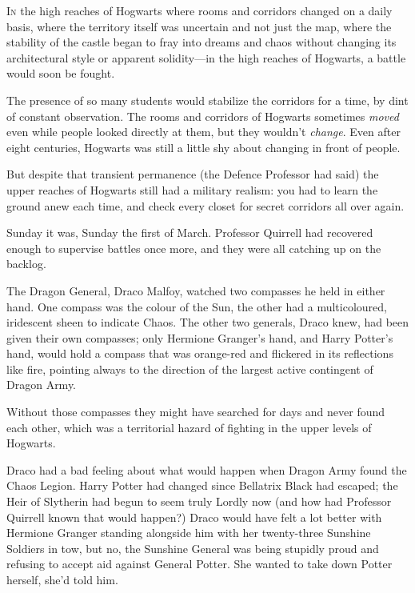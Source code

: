 
\lettrine{I}{n} the high
reaches of Hogwarts where rooms and corridors changed on a daily basis, where
the territory itself was uncertain and not just the map, where the stability of
the castle began to fray into dreams and chaos without changing its
architectural style or apparent solidity—in the high reaches of Hogwarts, a
battle would soon be fought.

The presence of so many students would stabilize the corridors for a time, by
dint of constant observation. The rooms and corridors of Hogwarts sometimes
\emph{moved} even while people looked directly at them, but they wouldn't
\emph{change}. Even after eight centuries, Hogwarts was still a little shy
about changing in front of people.

But despite that transient permanence (the Defence Professor had said) the
upper reaches of Hogwarts still had a military realism: you had to learn the
ground anew each time, and check every closet for secret corridors all over
again.

Sunday it was, Sunday the first of March. Professor Quirrell had recovered
enough to supervise battles once more, and they were all catching up on the
backlog.

The Dragon General, Draco Malfoy, watched two compasses he held in either hand.
One compass was the colour of the Sun, the other had a multicoloured, iridescent
sheen to indicate Chaos. The other two generals, Draco knew, had been given
their own compasses; only Hermione Granger's hand, and Harry Potter's hand,
would hold a compass that was orange-red and flickered in its reflections like
fire, pointing always to the direction of the largest active contingent of
Dragon Army.

Without those compasses they might have searched for days and never found each
other, which was a territorial hazard of fighting in the upper levels of
Hogwarts.

Draco had a bad feeling about what would happen when Dragon Army found the
Chaos Legion. Harry Potter had changed since Bellatrix Black had escaped; the
Heir of Slytherin had begun to seem truly Lordly now (and how had Professor
Quirrell known that would happen?) Draco would have felt a lot better with
Hermione Granger standing alongside him with her twenty-three Sunshine Soldiers
in tow, but no, the Sunshine General was being stupidly proud and refusing to
accept aid against General Potter. She wanted to take down Potter herself,
she'd told him.

